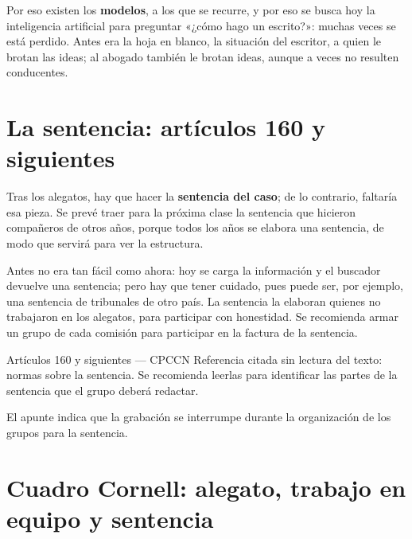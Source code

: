 \documentclass[12pt,oneside]{book}
\begin{document}
Por eso existen los \textbf{modelos}, a los que se recurre, y por eso se busca hoy la inteligencia artificial para preguntar «¿cómo hago un escrito?»: muchas veces se está perdido. Antes era la hoja en blanco, la situación del escritor, a quien le brotan las ideas; al abogado también le brotan ideas, aunque a veces no resulten conducentes.

\section{La sentencia: artículos 160 y siguientes}

Tras los alegatos, hay que hacer la \textbf{sentencia del caso}; de lo contrario, faltaría esa pieza. Se prevé traer para la próxima clase la sentencia que hicieron compañeros de otros años, porque todos los años se elabora una sentencia, de modo que servirá para ver la estructura.

Antes no era tan fácil como ahora: hoy se carga la información y el buscador devuelve una sentencia; pero hay que tener cuidado, pues puede ser, por ejemplo, una sentencia de tribunales de otro país. La sentencia la elaboran quienes no trabajaron en los alegatos, para participar con honestidad. Se recomienda armar un grupo de cada comisión para participar en la factura de la sentencia.

\begin{norma}{Artículos 160 y siguientes --- CPCCN}
Referencia citada sin lectura del texto: normas sobre la sentencia. Se recomienda leerlas para identificar las partes de la sentencia que el grupo deberá redactar.
\end{norma}

\begin{note}
El apunte indica que la grabación se interrumpe durante la organización de los grupos para la sentencia.
\end{note}

\section{Cuadro Cornell: alegato, trabajo en equipo y sentencia}
\end{document}

